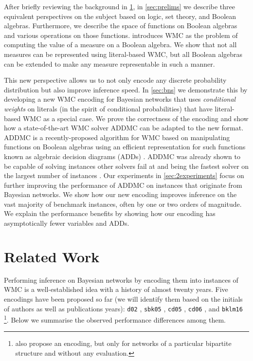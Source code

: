 After briefly reviewing the background in \cref{sec:related}, in
\cref{sec:prelims} we  describe three equivalent perspectives on the subject
based on logic, set theory, and Boolean algebras. Furthermore, we describe the
space of functions on Boolean algebras and various operations on those
functions.  introduces WMC as the problem of computing
the value of a measure on a Boolean algebra. We show that not all measures can
be represented using literal-based WMC, but all Boolean algebras can be extended
to make any measure representable in such a manner.

This new perspective allows us to not only encode any discrete probability
distribution but also improve inference speed. In \cref{sec:bns} we demonstrate
this by developing a new WMC encoding for Bayesian networks that uses
\emph{conditional weights} on literals (in the spirit of conditional
probabilities) that have literal-based WMC as a special case. We prove the
correctness of the encoding and show how a state-of-the-art WMC solver
\textsf{ADDMC} \citep{DBLP:conf/aaai/DudekPV20} can be adapted to the new
format. \textsf{ADDMC} is a recently-proposed algorithm for WMC based on
manipulating functions on Boolean algebras using an efficient representation for
such functions known as algebraic decision diagrams (ADDs)
\citep{DBLP:journals/fmsd/BaharFGHMPS97}. \textsf{ADDMC} was already shown to be
capable of solving instances other solvers fail at and being the fastest solver
on the largest number of instances \citep{DBLP:conf/aaai/DudekPV20}. Our
experiments in \cref{sec:2experiments} focus on further improving the performance
of \textsf{ADDMC} on instances that originate from Bayesian networks. We show
how our new encoding improves inference on the vast majority of benchmark
instances, often by one or two orders of magnitude. We explain the performance
benefits by showing how our encoding has asymptotically fewer variables and
ADDs.

\section{Related Work} \label{sec:related}

Performing inference on Bayesian networks by encoding them into instances of WMC
is a well-established idea with a history of almost twenty years. Five encodings
have been proposed so far (we will identify them based on the initials of
authors as well as publications years): \texttt{d02}
\citep{DBLP:conf/kr/Darwiche02}, \texttt{sbk05} \citep{DBLP:conf/aaai/SangBK05},
\texttt{cd05} \citep{DBLP:conf/ijcai/ChaviraD05}, \texttt{cd06}
\citep{DBLP:conf/sat/ChaviraD06}, and \texttt{bklm16}
\citep{DBLP:conf/ecai/BartKLM16}\footnote{\citet{DBLP:conf/scai/VomlelT13} also
  propose an encoding, but only for networks of a particular bipartite structure
  and without any evaluation.}. Below we summarise the observed performance
differences among them.

